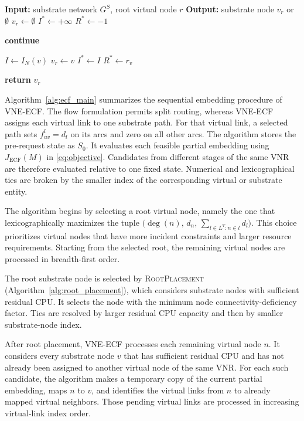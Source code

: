 \documentclass{ieeeaccess}
\newcommand{\ecfvne}{VNE-ECF}
\begin{document}
\begin{algorithm}[!t]
	\caption{RootPlacement}
	\label{alg:root_placement}
	\footnotesize
	\begin{algorithmic}[1]
		\STATE \textbf{Input:} substrate network $G^S$, root virtual node $r$
		\STATE \textbf{Output:} substrate node $v_r$ or $\emptyset$
		\STATE $v_r\leftarrow\emptyset$
		\STATE $I^*\leftarrow+\infty$
		\STATE $R^*\leftarrow-1$
		
		\STATE \textbf{continue}
		\ENDIF
		
		\STATE $I\leftarrow I_N(v)$
		\STATE $v_r\leftarrow v$
		\STATE $I^*\leftarrow I$
		\STATE $R^*\leftarrow r_v$
		\ENDIF
		\ENDFOR
		
		\STATE \textbf{return} $v_r$
	\end{algorithmic}
\end{algorithm}

Algorithm~\ref{alg:ecf_main} summarizes the sequential embedding procedure of \ecfvne{}. The flow
formulation permits split routing, whereas \ecfvne{} assigns each virtual link to one substrate
path. For that virtual link, a selected path sets $f_{uv}^l=d_l$ on its arcs and zero on all other
arcs. The algorithm stores the pre-request state as $S_0$. It evaluates each feasible partial embedding using
$J_{\mathrm{ECF}}(M)$ in \eqref{eq:objective}. Candidates from different stages of the same VNR are
therefore evaluated relative to one fixed state. Numerical and lexicographical ties are broken by
the smaller index of the corresponding virtual or substrate entity.

The algorithm begins by selecting a root virtual node, namely the one that lexicographically
maximizes the tuple $\bigl(\deg(n),\,d_n,\,\sum_{l\in L^V:n\in l}d_l\bigr)$. This choice
prioritizes virtual nodes that have more incident constraints and larger resource requirements.
Starting from the selected root, the remaining virtual nodes are processed in breadth-first
order.

The root substrate node is selected by \textsc{RootPlacement} (Algorithm~\ref{alg:root_placement}),
which considers substrate nodes with sufficient residual CPU. It selects the node with the minimum
node connectivity-deficiency factor. Ties are resolved by larger residual CPU capacity and then by
smaller substrate-node index.

After root placement, \ecfvne{} processes each remaining virtual node $n$.
It considers every substrate node $v$ that has sufficient residual CPU and
has not already been assigned to another virtual node of the same VNR. For
each such candidate, the algorithm makes a temporary copy of the current
partial embedding, maps $n$ to $v$, and identifies the virtual links from
$n$ to already mapped virtual neighbors. Those pending virtual links are
processed in increasing virtual-link index order.
\end{document}
